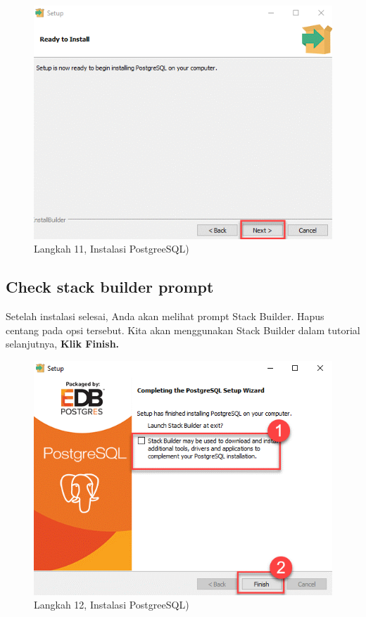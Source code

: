 \documentclass[
]{book}
\begin{document}
\begin{figure}

{\centering \includegraphics[width=1\linewidth]{./images/Bab1/Postgree10} 

}

\caption{Langkah 11, Instalasi PostgreeSQL)}\label{fig:install-posrgree11}
\end{figure}

\hypertarget{check-stack-builder-prompt}{%
\subsection{Check stack builder prompt}\label{check-stack-builder-prompt}}

Setelah instalasi selesai, Anda akan melihat prompt Stack Builder. Hapus centang pada opsi tersebut. Kita akan menggunakan Stack Builder dalam tutorial selanjutnya, \textbf{Klik Finish.}

\begin{figure}

{\centering \includegraphics[width=1\linewidth]{./images/Bab1/Postgree11} 

}

\caption{Langkah 12, Instalasi PostgreeSQL)}\label{fig:install-posrgree12}
\end{figure}
\end{document}

